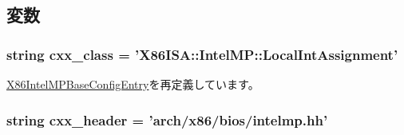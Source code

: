 \subsection{変数}
\hypertarget{classIntelMP_1_1X86IntelMPLocalIntAssignment_a58cd55cd4023648e138237cfc0822ae3}{
\subsubsection[{cxx\_\-class}]{\setlength{\rightskip}{0pt plus 5cm}string {\bf cxx\_\-class} = '{\bf X86ISA::IntelMP::LocalIntAssignment}'}}
\label{classIntelMP_1_1X86IntelMPLocalIntAssignment_a58cd55cd4023648e138237cfc0822ae3}


\hyperlink{classIntelMP_1_1X86IntelMPBaseConfigEntry_a58cd55cd4023648e138237cfc0822ae3}{X86IntelMPBaseConfigEntry}を再定義しています。\hypertarget{classIntelMP_1_1X86IntelMPLocalIntAssignment_a17da7064bc5c518791f0c891eff05fda}{
\subsubsection[{cxx\_\-header}]{\setlength{\rightskip}{0pt plus 5cm}string {\bf cxx\_\-header} = 'arch/x86/bios/intelmp.hh'}}
\label{classIntelMP_1_1X86IntelMPLocalIntAssignment_a17da7064bc5c518791f0c891eff05fda}


